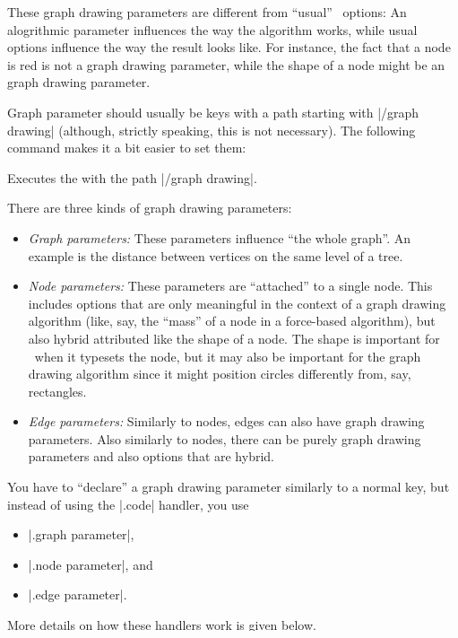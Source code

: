 These graph drawing parameters are different from ``usual'' \pgfname\
options: An alogrithmic parameter influences the way the algorithm
works, while usual options influence the way the result
looks like. For instance, the fact that a node is red is not a
graph drawing parameter, while the shape of a node might be an graph
drawing parameter. 

Graph parameter should usually be keys with a path starting with
|/graph drawing| (although, strictly speaking, this is not
necessary). The following command makes it a bit easier to set them:
\begin{command}{\pgfgdset\marg{options}}
  Executes the  with the path |/graph drawing|.  
\end{command}

There are three kinds of graph drawing parameters:

\begin{itemize}
\item \emph{Graph parameters:}
  These parameters influence ``the whole graph''. An example
  is the distance between vertices on the same level of a tree.
\item \emph{Node parameters:}
  These parameters are ``attached'' to a single node. This includes
  options that are only meaningful in the context of a graph
  drawing algorithm (like, say, the ``mass'' of a node in a
  force-based algorithm), but also hybrid attributed like the shape
  of a node. The shape is important for \pgfname\ when it typesets the 
  node, but it may also be important for the graph drawing
  algorithm since it might position circles differently from, say,
  rectangles.
\item \emph{Edge parameters:}
  Similarly to nodes, edges can also have graph drawing
  parameters. Also similarly to nodes, there can be purely
  graph drawing parameters and also options that are hybrid.
\end{itemize}
   
You have to ``declare'' a graph drawing parameter similarly to a
normal key, but instead of using the |.code| handler, you use
\begin{itemize}
\item |.graph parameter|,
\item |.node parameter|, and
\item |.edge parameter|.
\end{itemize}
More details on how these handlers work is given below.

Specifying the set of graph drawing parameters for a given graph or
node or edge works as follows: When the graph drawing engine is
started for a graph (using |\pgfgdbeginscope|), a snapshot is taken of
all graph drawing graph parameters currently setup at this
point. Similarly, when a node is created inside such a scope (using
|\pgfnode|), a snapshot is taken of the set of all graph drawing node
parameters in force at this point is taken and stored together with
the node. Finally, when an edge is created (using |\pgfgdedge|), a
snapshot of the setting of the graph drawing edge parameters is
taken. 

